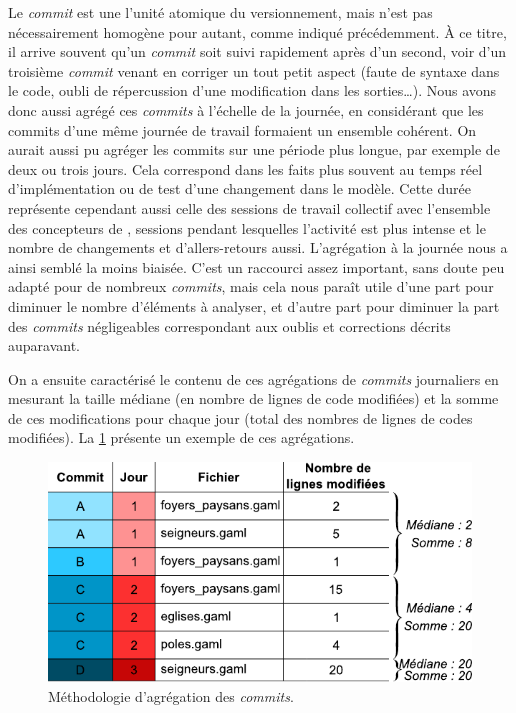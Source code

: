 Le \textit{commit} est une l'unité \og atomique\fg{} du versionnement, mais n'est pas nécessairement homogène pour autant, comme indiqué précédemment.
À ce titre, il arrive souvent qu'un \textit{commit} soit suivi rapidement après d'un second, voir d'un troisième \textit{commit} venant en corriger un tout petit aspect (faute de syntaxe dans le code, oubli de répercussion d'une modification dans les sorties\ldots).
Nous avons donc aussi agrégé ces \textit{commits} à l'échelle de la journée, en considérant que les commits d'une même journée de travail formaient un ensemble cohérent.
On aurait aussi pu agréger les commits sur une période plus longue, par exemple de deux ou trois jours.
Cela correspond dans les faits plus souvent au temps réel d'implémentation ou de test d'une changement dans le modèle.
Cette durée représente cependant aussi celle des sessions de travail collectif avec l'ensemble des concepteurs de \simfeodal{}, sessions pendant lesquelles l'activité est plus intense et le nombre de changements et d'allers-retours aussi.
L'agrégation à la journée nous a ainsi semblé la moins biaisée.
C'est un raccourci assez important, sans doute peu adapté pour de nombreux \textit{commits}, mais cela nous paraît utile d'une part pour diminuer le nombre d'éléments à analyser, et d'autre part pour diminuer la part des \textit{commits} négligeables correspondant aux oublis et corrections décrits auparavant.

On a ensuite caractérisé le contenu de ces agrégations de \textit{commits} journaliers en mesurant la taille médiane (en nombre de lignes de code modifiées) et la somme de ces modifications pour chaque jour (total des nombres de lignes de codes modifiées).
La \cref{fig:methodo-agreg-commits} présente un exemple de ces agrégations.

\begin{figure}[H]
	\centering
	\includegraphics[width=.75\linewidth]{img/tableau_exemple_commits.pdf}
	\caption[Méthodologie d'agrégation des \textit{commits}.]{Méthodologie d'agrégation des \textit{commits}.}
	\label{fig:methodo-agreg-commits}
\end{figure}

